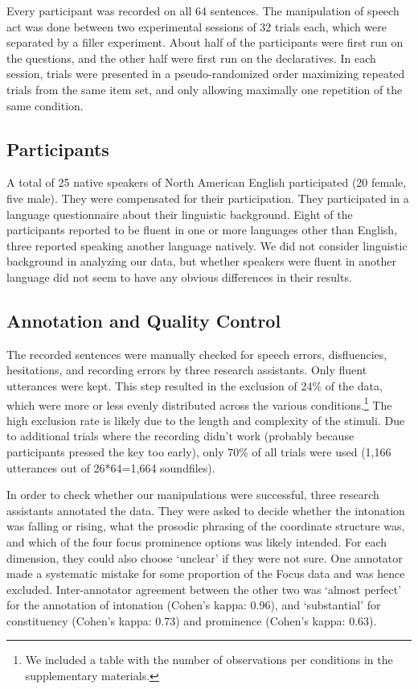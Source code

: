 \documentclass[preprint,review,12pt,authoryear,times]{elsarticle}
\begin{document}
Every participant was recorded on all 64 sentences. The manipulation of speech act was done between two experimental sessions of 32 trials each, which were separated by a filler experiment. About half of the participants were first run on the questions, and the other half were first run on the declaratives.  In each session, trials were presented in a pseudo-randomized order maximizing repeated trials from the same item set, and only allowing maximally one repetition of the same condition. 


\subsection{Participants}

A total of 25 native speakers of North American English participated (20 female, five male). They were compensated for their participation. They participated in a language questionnaire about their linguistic background. Eight of the participants reported to be fluent in one or more languages other than English, three reported speaking another language natively. We did not consider linguistic background in analyzing our data, but whether speakers were fluent in another language did not seem to have any obvious differences in their results. 


\subsection{Annotation and Quality Control}

The recorded sentences were manually checked for speech errors, disfluencies, hesitations, and recording errors by three research assistants. Only fluent utterances were kept. This step resulted in the exclusion of  24\% of the data, which were more or less evenly distributed across the various conditions.\footnote{We included a table with the number of observations per conditions in the supplementary materials.}  The high exclusion rate is likely due to the length and complexity of the stimuli. Due to additional trials where the recording didn't work (probably because participants pressed the key too early), only 70\% of all trials were used (1,166 utterances out of 26*64=1,664 soundfiles). 

In order to check whether our manipulations were successful, three research assistants annotated the data. They were asked to decide whether the intonation was falling or rising, what the prosodic phrasing of the coordinate structure was, and which of the four focus prominence options was likely intended. For each dimension, they could also choose `unclear' if they were not sure. One annotator made a systematic mistake for some proportion of the Focus data and was hence excluded. Inter-annotator agreement between the other two was `almost perfect' for the annotation of intonation (Cohen's kappa: 0.96), and `substantial' for constituency (Cohen's kappa: 0.73) and prominence (Cohen's kappa: 0.63). 
\end{document}
